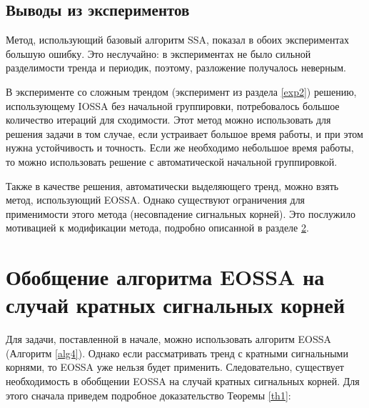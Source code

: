 \documentclass[specialist, substylefile = spbureport.rtx, subf,href,colorlinks=true, 12pt]{disser}
\theoremstyle{definition}
\begin{document}
\section{Выводы из экспериментов}
Метод, использующий базовый алгоритм SSA, показал в обоих экспериментах большую ошибку. Это неслучайно: в экспериментах не было сильной разделимости тренда и периодик, поэтому, разложение получалось неверным.

В эксперименте со сложным трендом (эксперимент из раздела \ref{exp2}) решению, использующему IOSSA без начальной группировки, потребовалось большое количество итераций для сходимости. Этот метод можно использовать для решения задачи в том случае, если устраивает большое время работы, и при этом нужна устойчивость и точность. Если же необходимо небольшое время работы, то можно использовать решение с автоматической начальной группировкой.

Также в качестве решения, автоматически выделяющего тренд, можно взять метод, использующий EOSSA. Однако существуют ограничения для применимости этого метода (несовпадение сигнальных корней). Это послужило мотивацией к модификации метода, подробно описанной в разделе \ref{ch3}.

\chapter{Обобщение алгоритма EOSSA на случай кратных сигнальных корней}
\label{ch3}
Для задачи, поставленной в начале, можно использовать алгоритм EOSSA (Алгоритм \ref{alg4}). Однако если рассматривать тренд с кратными сигнальными корнями, то EOSSA уже нельзя будет применить. Следовательно, существует необходимость в обобщении EOSSA на случай кратных сигнальных корней. Для этого сначала приведем подробное доказательство Теоремы \ref{th1}:
\end{document}

